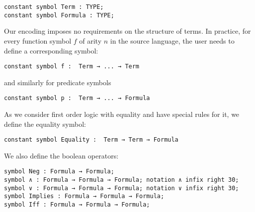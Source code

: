 \documentclass{article}
\begin{document}
	\begin{lstlisting}[language=Dialekto, firstnumber=last]
constant symbol Term : TYPE;
constant symbol Formula : TYPE;
	\end{lstlisting}
	Our encoding imposes no requirements on the structure of terms. In practice,  for every function symbol $f$ of arity $n$ in the source language, the user needs to define a corresponding symbol:
	\begin{lstlisting}[language=Dialekto, firstnumber=last]
constant symbol f :  Term → ... → Term
	\end{lstlisting}
	and similarly for predicate symbols
	\begin{lstlisting}[language=Dialekto, firstnumber=last]
constant symbol p :  Term → ... → Formula
	\end{lstlisting}
	As we consider first order logic with equality and have special rules for it, we define the equality symbol:
	\begin{lstlisting}[language=Dialekto, firstnumber=last]
constant symbol Equality :  Term → Term → Formula
	\end{lstlisting}
	We also define the boolean operators:
	\begin{lstlisting}[language=Dialekto, firstnumber=last]
symbol Neg : Formula → Formula;
symbol ∧ : Formula → Formula → Formula; notation ∧ infix right 30;
symbol ∨ : Formula → Formula → Formula; notation ∨ infix right 30;
symbol Implies : Formula → Formula → Formula;
symbol Iff : Formula → Formula → Formula;
\end{lstlisting}
\end{document}
